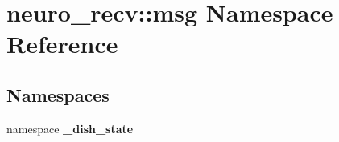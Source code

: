 \section{neuro\-\_\-recv\-:\-:msg \-Namespace \-Reference}
\label{namespaceneuro__recv_1_1msg}
\subsection*{\-Namespaces}
\begin{DoxyCompactItemize}
\item 
namespace {\bf \-\_\-dish\-\_\-state}
\end{DoxyCompactItemize}

